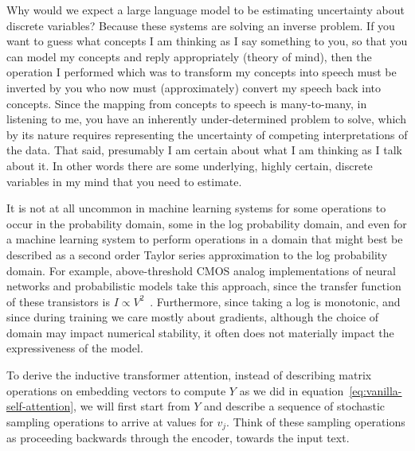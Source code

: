 \documentclass{article}
\begin{document}
Why would we expect a large language model to be estimating uncertainty about discrete variables?  Because these systems are solving an inverse problem.  If you want to guess what concepts I am thinking as I say something to you, so that you can model my concepts and reply appropriately (theory of mind), then the operation I performed which was to transform my concepts into speech must be inverted by you who now must (approximately) convert my speech back into concepts.  Since the mapping from concepts to speech is many-to-many, in listening to me, you have an inherently under-determined problem to solve, which by its nature requires representing the uncertainty of competing interpretations of the data.  That said, presumably I am certain about what I am thinking as I talk about it. In other words there are some underlying, highly certain, discrete variables in my mind that you need to estimate.

It is not at all uncommon in machine learning systems for some operations to occur in the probability domain, some in the log probability domain, and even for a machine learning system to perform operations in a domain that might best be described as a second order Taylor series approximation to the log probability domain.  For example, above-threshold CMOS analog implementations of neural networks and probabilistic models take this approach, since the transfer function of these transistors is $I \propto V^2$~\citep{BenVigodaThesis}. Furthermore, since taking a log is monotonic, and since during training we care mostly about gradients, although the choice of domain may impact numerical stability, it often does not materially impact the expressiveness of the model.

To derive the inductive transformer attention, instead of describing matrix operations on embedding vectors to compute $Y$ as we did in equation~\ref{eq:vanilla-self-attention}, we will first start from $Y$ and describe a sequence of stochastic sampling operations to arrive at values for $v_j$.  Think of these sampling operations as proceeding backwards through the encoder, towards the input text.
\end{document}
